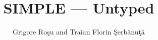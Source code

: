 
\setlength{\parindent}{1em}
\title{SIMPLE --- Untyped}
\author{Grigore Ro\c{s}u and Traian Florin \c{S}erb\u{a}nu\c{t}\u{a}}

\maketitle

